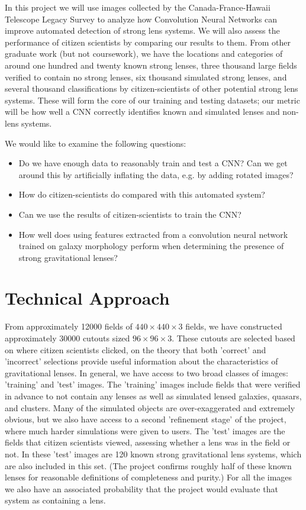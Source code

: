 \documentclass[10pt,twocolumn,letterpaper]{article}
\begin{document}
In this project we will use images collected by the Canada-France-Hawaii
Telescope Legacy Survey to analyze how Convolution Neural Networks can improve
automated detection of strong lens systems. We will also assess the performance
of citizen scientists by comparing our results to them. From other graduate
work (but not coursework), we have the locations and categories of around one
hundred and twenty known strong lenses, three thousand large fields verified to
contain no strong lenses, six thousand simulated strong lenses, and several
thousand classifications by citizen-scientists of other potential strong lens
systems.  These will form the core of our training and testing datasets; our
metric will be how well a CNN correctly identifies known and simulated lenses
and non-lens systems.

We would like to examine the following questions:
\begin{itemize}
\item{ Do we have enough data to reasonably train and test a CNN? Can we get
       around this by artificially inflating the data, e.g. by adding rotated
     images?}
\item{ How do citizen-scientists do compared with this automated system?}
\item{ Can we use the results of citizen-scientists to train the CNN?}
\item{ How well does using features extracted from a convolution neural network
       trained on galaxy morphology perform when determining the presence of
     strong gravitational lenses?}
\end{itemize}


\section{Technical Approach}

From approximately 12000 fields of $440\times440\times3$ fields, we have
constructed approximately 30000 cutouts sized $96\times96\times3$. These cutouts
are selected based on where citizen scientists clicked, on the theory that both
'correct' and 'incorrect' selections provide useful information about the
characteristics of gravitational lenses. In general, we have access to two
broad classes of images: 'training' and 'test' images. The 'training' images
include fields that were verified in advance to not contain any lenses as well
as simulated lensed galaxies, quasars, and clusters. Many of the simulated
objects are over-exaggerated and extremely obvious, but we also have access to
a second 'refinement stage' of the project, where much harder simulations were
given to users. The 'test' images are the fields that citizen scientists
viewed, assessing whether a lens was in the field or not. In these 'test'
images are 120 known strong gravitational lens systems, which are also included
in this set. (The project confirms roughly half of these known lenses for
reasonable definitions of completeness and purity.) For all the images we also
have an associated probability that the project would evaluate that system as
containing a lens.
\end{document}
